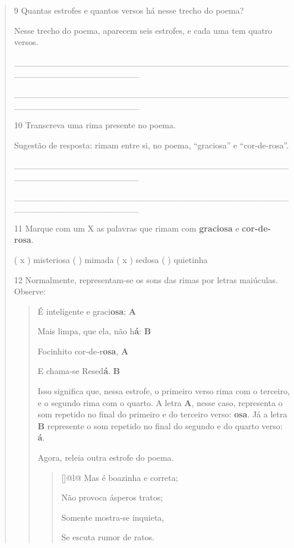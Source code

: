 \begin{quote}
\num{9} Quantas estrofes e quantos versos há nesse trecho do poema?

Nesse trecho do poema, aparecem seis estrofes, e cada uma tem quatro versos.

\_\_\_\_\_\_\_\_\_\_\_\_\_\_\_\_\_\_\_\_\_\_\_\_\_\_\_\_\_\_\_\_\_\_\_\_\_\_\_\_\_\_\_\_\_\_\_\_\_\_\_\_\_\_\_\_\_\_\_\_\_\_\_\_

\_\_\_\_\_\_\_\_\_\_\_\_\_\_\_\_\_\_\_\_\_\_\_\_\_\_\_\_\_\_\_\_\_\_\_\_\_\_\_\_\_\_\_\_\_\_\_\_\_\_\_\_\_\_\_\_\_\_\_\_\_\_\_\_

\num{10} Transcreva uma rima presente no poema.

Sugestão de resposta: rimam entre si, no poema, ``graciosa'' e ``cor-de-rosa''.

\_\_\_\_\_\_\_\_\_\_\_\_\_\_\_\_\_\_\_\_\_\_\_\_\_\_\_\_\_\_\_\_\_\_\_\_\_\_\_\_\_\_\_\_\_\_\_\_\_\_\_\_\_\_\_\_\_\_\_\_\_\_\_\_

\_\_\_\_\_\_\_\_\_\_\_\_\_\_\_\_\_\_\_\_\_\_\_\_\_\_\_\_\_\_\_\_\_\_\_\_\_\_\_\_\_\_\_\_\_\_\_\_\_\_\_\_\_\_\_\_\_\_\_\_\_\_\_\_

\num{11} Marque com um X as palavras que rimam com \textbf{graciosa} e
\textbf{cor-de-rosa}.

( x ) misteriosa ( ) mimada ( x ) sedosa ( ) quietinha

\num{12} Normalmente, representam-se os sons das rimas por letras maiúculas. Observe:

\begin{quote}
É inteligente e graci\textbf{osa}; \textbf{A}

Mais limpa, que ela, não h\textbf{á}: \textbf{B}

Focinhito cor‑de‑r\textbf{osa}, \textbf{A}

E chama‑se Resed\textbf{á}. \textbf{B}

Isso significa que, nessa estrofe, o primeiro verso rima com o terceiro, e o segundo rima com o quarto. A letra \textbf{A}, nesse caso, representa o som repetido no final do primeiro e do terceiro verso: \textbf{osa}. Já a letra \textbf{B} represente o som repetido no final do segundo e do quarto verso: \textbf{á}.

Agora, releia outra estrofe do poema.

\begin{quote}[]{@{}l@{}}
Mas é boazinha e correta;

Não provoca ásperos tratos;

Somente mostra-se inquieta,

Se escuta rumor de ratos.\strut
\end{quote}


\end{quote}
\end{quote}
